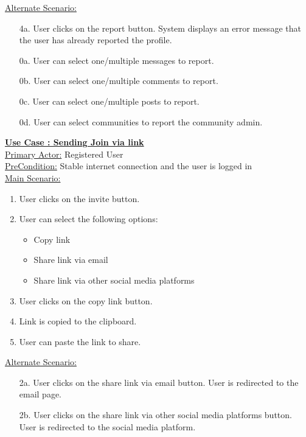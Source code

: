\documentclass[conference,compsoc]{IEEEtran}
\newcounter{UC}
\newcommand{\nextU}{\stepcounter{UC}\theUC}
\begin{document}
\underline{Alternate Scenario:}\\
\begin{enumerate}
    \item [4a.] User clicks on the report button. System displays an error message that the user has already reported the profile.
    \item [0a.] User can select one/multiple messages to report.
    \item [0b.] User can select one/multiple comments to report.
    \item [0c.] User can select one/multiple posts to report.
    \item [0d.] User can select communities to report the community admin.
\end{enumerate}\vspace{0.2cm}

\underline{\textbf{Use Case \nextU: Sending Join via link}}\\

\underline{Primary Actor:} Registered User\\

\underline{PreCondition:} Stable internet connection and the user is logged in\\

\underline{Main Scenario:}\\

\begin{enumerate}
    \item User clicks on the invite button.
    \item User can select the following options:
          \begin{itemize}
              \item Copy link
              \item Share link via email
              \item Share link via other social media platforms
          \end{itemize}
    \item User clicks on the copy link button.
    \item Link is copied to the clipboard.
    \item User can paste the link to share.
\end{enumerate}

\underline{Alternate Scenario:}\\
\begin{enumerate}
    \item [2a.] User clicks on the share link via email button. User is redirected to the email page.
    \item [2b.] User clicks on the share link via other social media platforms button. User is redirected to the social media platform.
\end{enumerate}\vspace{0.2cm}
\end{document}

